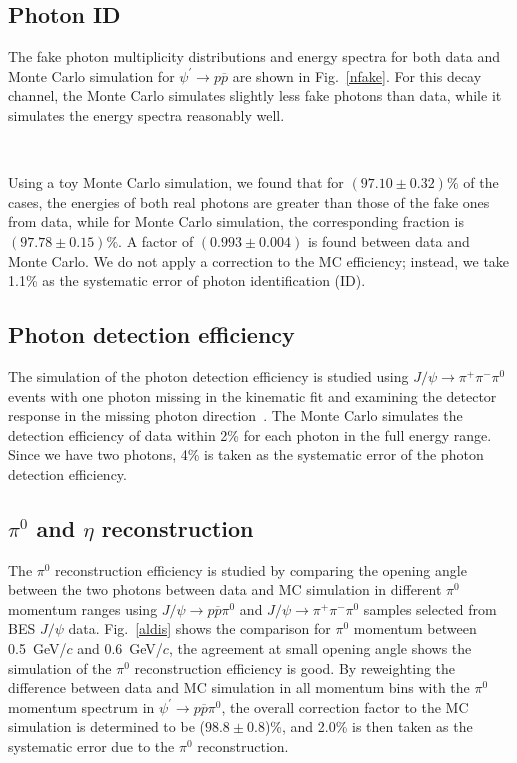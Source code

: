 \documentclass[prd,twocolumn,showpacs,amsmath,amssymb]{revtex4}
\newcommand{\jpsi}{J/\psi}
\newcommand{\pip}{\pi^+}
\newcommand{\pim}{\pi^-}
\newcommand{\piz}{\pi^0}
\newcommand{\pp}{\pi^+\pi^-}
\newcommand{\ppb}{p\overline{p}}
\newcommand{\jpsito}{J/\psi \rightarrow }
\newcommand{\psipto}{\psi^\prime \rightarrow }
\newcommand{\pspto}{\psi^\prime \rightarrow }
\begin{document}
\subsection{Photon ID}

The fake photon multiplicity distributions and energy spectra for
both data and Monte Carlo simulation for $\psipto \ppb$ are shown
in Fig.~\ref{nfake}. For this decay channel, the Monte Carlo
simulates slightly less fake photons than data, while it simulates
the energy spectra reasonably well.

\begin{figure*}[htbp]
\centerline{\hbox{
}}
\caption{Fake photon multiplicity distributions (left) and fake
photon energy spectra (right) for $\psipto \ppb$ data (dots with
error bars) and Monte Carlo simulation (histogram).} \label{nfake}
\end{figure*}

Using a toy Monte Carlo simulation, we found that for $(97.10\pm
0.32)\%$ of the cases, the energies of both real photons are
greater than those of the fake ones from data, while for Monte
Carlo simulation, the corresponding fraction is $(97.78\pm
0.15)\%$. A factor of $(0.993\pm0.004)$ is found between data and
Monte Carlo. We do not apply a correction to the MC efficiency;
instead, we take 1.1\% as the systematic error of photon
identification (ID).

\subsection{Photon detection efficiency}

The simulation of the photon detection efficiency is studied using
$\jpsito \pp\piz$ events with one photon missing in the kinematic
fit and examining the detector response in the missing photon
direction~\cite{lism}. The Monte Carlo simulates the detection
efficiency of data within 2\% for each photon in the full energy
range. Since we have two photons, 4\% is taken as the systematic
error of the photon detection efficiency.

\subsection{\boldmath $\piz$ and $\eta$ reconstruction}

The $\piz$ reconstruction efficiency is studied by comparing the
opening angle between the two photons between data and MC
simulation in different $\piz$ momentum ranges using $\jpsito \ppb
\piz$ and $\jpsito \pip\pim\piz$ samples selected from BES $\jpsi$
data. Fig.~\ref{aldis} shows the comparison for $\piz$ momentum
between 0.5~GeV/$c$ and 0.6~GeV/$c$, the agreement at small
opening angle shows the simulation of the $\piz$ reconstruction
efficiency is good. By reweighting the difference between data and
MC simulation in all momentum bins with the $\piz$ momentum
spectrum in $\pspto \ppb\piz$, the overall correction factor to
the MC simulation is determined to be ($98.8\pm0.8$)\%, and 2.0\%
is then taken as the systematic error due to the $\piz$
reconstruction.
\end{document}
